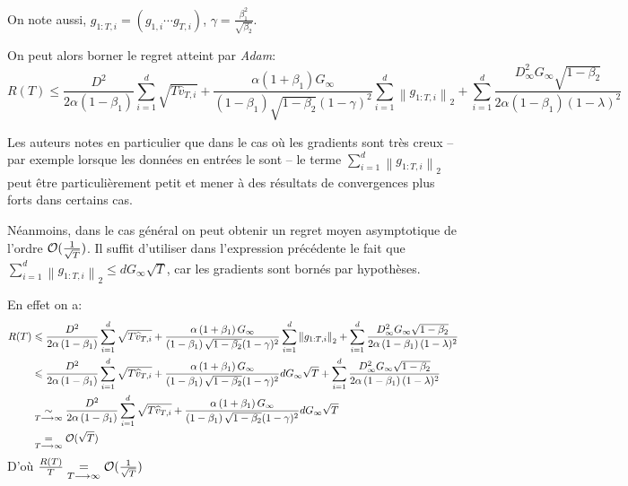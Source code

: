 \documentclass[fleqn,11pt, titlepage, french]{article}
\begin{document}
	On note aussi, $g_{1:T, i} = (g_{1,i} \cdots g_{T,i})$, $\gamma = \frac{\beta_1^2}{\sqrt{\beta_2}}$.
	
	On peut alors borner le regret atteint par \emph{Adam}:
	\[R(T) \leq \frac{D^{2}}{2 \alpha\left(1-\beta_{1}\right)} \sum_{i=1}^{d} \sqrt{T \widehat{v}_{T, i}}+\frac{\alpha\left(1+\beta_{1}\right) G_{\infty}}{\left(1-\beta_{1}\right) \sqrt{1-\beta_{2}}(1-\gamma)^{2}} \sum_{i=1}^{d}\left\|g_{1: T, i}\right\|_{2}+\sum_{i=1}^{d} \frac{D_{\infty}^{2} G_{\infty} \sqrt{1-\beta_{2}}}{2 \alpha\left(1-\beta_{1}\right)(1-\lambda)^{2}}\]
	
	Les auteurs notes en particulier que dans le cas où les gradients sont très creux -- par exemple lorsque les données en entrées le sont -- le terme $\sum_{i=1}^{d}\left\|g_{1: T, i}\right\|_{2}$ peut être particulièrement petit et mener à des résultats de convergences plus forts dans certains cas.
	
	Néanmoins, dans le cas général on peut obtenir un regret moyen asymptotique de l'ordre $\mathcal O(\frac{1}{\sqrt{T}})$. Il suffit d'utiliser dans l'expression précédente le fait que $\sum_{i=1}^{d}\left\|g_{1: T, i}\right\|_{2} \leq d G_\infty \sqrt{T}$, car les gradients sont bornés par hypothèses.
	
	En effet on a:
	\begin{align*}
		R(T) & \leqslant \frac{D^{2}}{2 \alpha\left(1-\beta_{1}\right)} \sum_{i=1}^{d} \sqrt{T \widehat{v}_{T, i}}+\frac{\alpha\left(1+\beta_{1}\right) G_{\infty}}{\left(1-\beta_{1}\right) \sqrt{1-\beta_{2}}(1-\gamma)^{2}} \sum_{i=1}^{d}\left\|g_{1: T, i}\right\|_{2}+\sum_{i=1}^{d} \frac{D_{\infty}^{2} G_{\infty} \sqrt{1-\beta_{2}}}{2 \alpha\left(1-\beta_{1}\right)(1-\lambda)^{2}} \\
		&\leqslant \frac{D^{2}}{2 \alpha\left(1-\beta_{1}\right)} \sum_{i=1}^{d} \sqrt{T \widehat{v}_{T, i}}+\frac{\alpha\left(1+\beta_{1}\right) G_{\infty}}{\left(1-\beta_{1}\right) \sqrt{1-\beta_{2}}(1-\gamma)^{2}} d G_\infty \sqrt{T} +\sum_{i=1}^{d} \frac{D_{\infty}^{2} G_{\infty} \sqrt{1-\beta_{2}}}{2 \alpha\left(1-\beta_{1}\right)(1-\lambda)^{2}} \\
		&\underset{T \longrightarrow \infty}{\sim} \frac{D^{2}}{2 \alpha\left(1-\beta_{1}\right)} \sum_{i=1}^{d} \sqrt{T \widehat{v}_{T, i}}+\frac{\alpha\left(1+\beta_{1}\right) G_{\infty}}{\left(1-\beta_{1}\right) \sqrt{1-\beta_{2}}(1-\gamma)^{2}} d G_\infty \sqrt{T} \\
		&\underset{T \longrightarrow \infty}{=} \mathcal O(\sqrt{T})
	\end{align*}
	D'où $\frac{R(T)}{T} \underset{T \longrightarrow \infty}{=} \mathcal O(\frac{1}{\sqrt{T}})$
\end{document}
